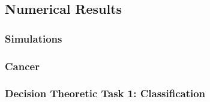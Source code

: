 \documentclass[10pt]{article}
\begin{document}
\newpage
\subsection{Numerical Results}

\subsubsection{Simulations}


\subsubsection{Cancer}


\subsubsection{Decision Theoretic Task 1: Classification}
\end{document}
